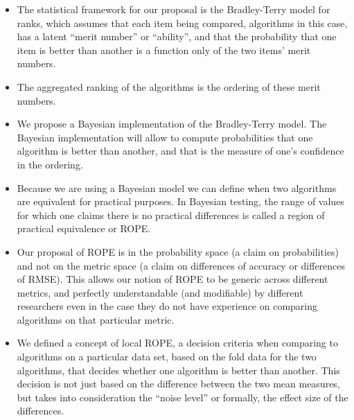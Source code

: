 \documentclass[twoside,11pt,preprint]{article}
\begin{document}
\begin{itemize}
\item
  The statistical framework for our proposal is the Bradley-Terry
  model for ranks, which assumes that each item being compared,
  algorithms in this case, has a latent ``merit number'' or ``ability'',
  and that the probability that one item is better than another is a
  function only of the two items' merit numbers.
\item
  The aggregated ranking of the algorithms is the ordering of these merit numbers.
\item
  We propose a Bayesian implementation of the Bradley-Terry model. The Bayesian implementation will allow to compute probabilities that one algorithm is better than another, and that is the measure of one's confidence in the ordering.
\item
  Because we are using a Bayesian model we can define when two
  algorithms are equivalent for practical purposes. In Bayesian
  testing, the range of values for which one claims there is no
  practical differences is called a region of practical equivalence or
  ROPE.
\item
  Our proposal of
  ROPE is in the probability space (a claim on probabilities) and not
  on the metric space (a claim on differences of accuracy or
  differences of RMSE). This allows our notion of ROPE to be generic
  across different metrics, and perfectly understandable (and
  modifiable) by different researchers even in the case they do not
  have experience on comparing algorithms on that particular metric.
\item
  We defined a concept of local ROPE, a decision criteria when
  comparing to algorithms on a particular data set, based on the fold
  data for the two algorithms, that decides whether one algorithm is
  better than another. This decision is not just based on the
  difference between the two mean measures, but takes into
  consideration the ``noise level'' or formally, the effect size of the
  differences.
\end{itemize}
\end{document}
